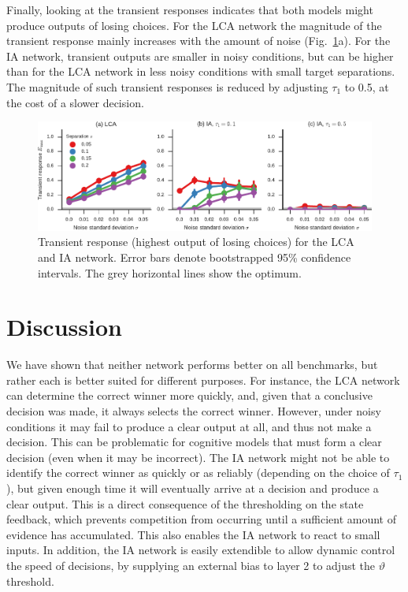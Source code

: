 \documentclass[10pt,letterpaper]{article}
\begin{document}
Finally, looking at the transient responses indicates that both models might produce outputs of losing choices.
For the LCA network the magnitude of the transient response mainly increases with the amount of noise (Fig.~\ref{fig:transient}a).
For the IA network, transient outputs are smaller in noisy conditions, but can be higher than for the LCA network in less noisy conditions with small target separations.
The magnitude of such transient responses is reduced by adjusting $\tau_1$ to 0.5, at the cost of a slower decision.
\begin{figure}
    \centering
    \includegraphics{figures/transient}
    \caption{
        Transient response (highest output of losing choices) for the LCA and IA network.
        Error bars denote bootstrapped 95\% confidence intervals.
        The grey horizontal lines show the optimum.
    }\label{fig:transient}
\end{figure}

\section{Discussion}
We have shown that neither network performs better on all benchmarks, but rather each is better suited for different purposes.
For instance, the LCA network can determine the correct winner more quickly, and, given that a conclusive decision was made, it always selects the correct winner.
However, under noisy conditions it may fail to produce a clear output at all, and thus not make a decision.
This can be problematic for cognitive models that must form a clear decision (even when it may be incorrect).
The IA network might not be able to identify the correct winner as quickly or as reliably (depending on the choice of $\tau_1$), but given enough time it will eventually arrive at a decision and produce a clear output.
This is a direct consequence of the thresholding on the state feedback, which prevents competition from occurring until a sufficient amount of evidence has accumulated.
This also enables the IA network to react to small inputs.
In addition, the IA network is easily extendible to allow dynamic control the speed of decisions, by supplying an external bias to layer 2 to adjust the $\vartheta$ threshold.
\end{document}
